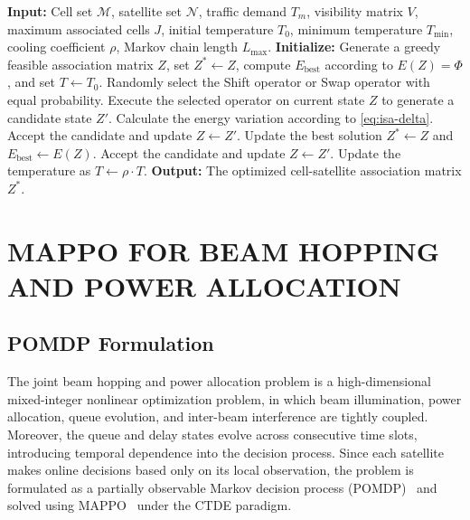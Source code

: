 \documentclass[journal]{IEEEtran}
\begin{document}
\begin{algorithm}[t]
\caption{Improved Simulated Annealing for P1}
\label{alg:isa}
\begin{algorithmic}[1]
\STATE \textbf{Input:} Cell set $\mathcal{M}$, satellite set $\mathcal{N}$, traffic demand $T_m$, visibility matrix $V$, maximum associated cells $J$, initial temperature $T_0$, minimum temperature $T_{\min}$, cooling coefficient $\rho$, Markov chain length $L_{\max}$.
\STATE \textbf{Initialize:} Generate a greedy feasible association matrix $Z$, set $Z^* \leftarrow Z$, compute $E_{\text{best}}$ according to $E(Z)=\Phi$, and set $T \leftarrow T_0$.
\STATE Randomly select the Shift operator or Swap operator with equal probability.
\STATE Execute the selected operator on current state $Z$ to generate a candidate state $Z'$.
\STATE Calculate the energy variation according to \eqref{eq:isa-delta}.
\STATE Accept the candidate and update $Z \leftarrow Z'$.
\STATE Update the best solution $Z^* \leftarrow Z$ and $E_{\text{best}} \leftarrow E(Z)$.
\ENDIF
\ELSE
{}
\STATE Accept the candidate and update $Z \leftarrow Z'$.
\ENDIF
\ENDIF
\ENDFOR
\STATE Update the temperature as $T \leftarrow \rho \cdot T$.
\ENDWHILE
\STATE \textbf{Output:} The optimized cell-satellite association matrix $Z^*$.
\end{algorithmic}
\end{algorithm}

\section{MAPPO FOR BEAM HOPPING AND POWER ALLOCATION}
\label{sec:mappo}
\subsection{POMDP Formulation}
\label{subsec:pomdp-formulation}

The joint beam hopping and power allocation problem is a high-dimensional mixed-integer nonlinear optimization problem, in which beam illumination, power allocation, queue evolution, and inter-beam interference are tightly coupled. Moreover, the queue and delay states evolve across consecutive time slots, introducing temporal dependence into the decision process. Since each satellite makes online decisions based only on its local observation, the problem is formulated as a partially observable Markov decision process (POMDP)~\cite{ref30} and solved using MAPPO~\cite{ref31} under the CTDE paradigm.
\end{document}
